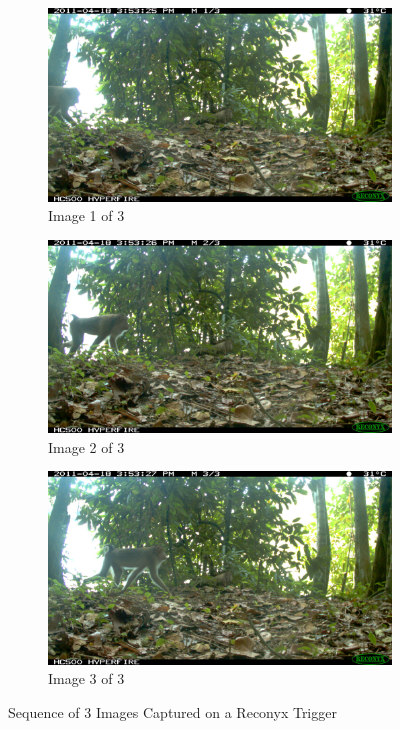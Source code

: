 \begin{figure}
\centering
\begin{subfigure}{.5\textwidth}
  \centering
  \includegraphics[width=\linewidth]{Chap3/figures/IMG_0568}
  \caption{Image 1 of 3}
\end{subfigure}%
\begin{subfigure}{.5\textwidth}
  \centering
\includegraphics[width=\linewidth]{Chap3/figures/IMG_0569}
  \caption{Image 2 of 3}
\end{subfigure}
\begin{subfigure}{.5\textwidth}
  \centering
 \includegraphics[width=\linewidth]{Chap3/figures/IMG_0570}
  \caption{Image 3 of 3}
\end{subfigure}
\caption{Sequence of 3 Images Captured on a Reconyx Trigger}
\label{tech:reconyx}
\end{figure}

